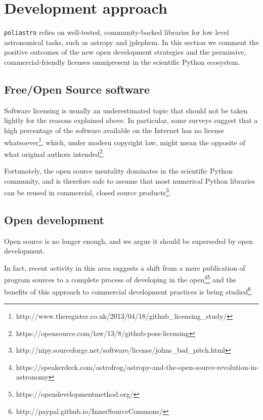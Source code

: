 \section{Development approach}
\label{sec:development}

\verb|poliastro| relies on well-tested, community-backed libraries for low level astronomical tasks, such as astropy\cite{Robitaille2013} and jplephem. In this section we comment the positive outcomes of the new open development strategies and the permissive, commercial-friendly licenses omnipresent in the scientific Python ecosystem.

\subsection{Free/Open Source software}


Software licensing is usually an underestimated topic that should not be taken lightly for the reasons explained above. In particular, some surveys suggest that a high percentage of the software available on the Internet has no license whatsoever\footnote{http://www.theregister.co.uk/2013/04/18/github_licensing_study/}, which, under modern copyright law, might mean the opposite of what original authors intended\footnote{https://opensource.com/law/13/8/github-poss-licensing}.

Fortunately, the open source mentality dominates in the scientific Python community, and is therefore safe to assume that most numerical Python libraries can be reused in commercial, closed source products\footnote{http://nipy.sourceforge.net/software/license/johns_bsd_pitch.html}.

\subsection{Open development}

Open source is no longer enough, and we argue it should be superseded by open development.

In fact, recent activity in this area suggests a shift from a mere publication of program sources to a complete process of developing in the open\footnote{https://speakerdeck.com/astrofrog/astropy-and-the-open-source-revolution-in-astronomy}\footnote{https://opendevelopmentmethod.org/} and the benefits of this approach to commercial development practices is being studied\footnote{http://paypal.github.io/InnerSourceCommons/}.
